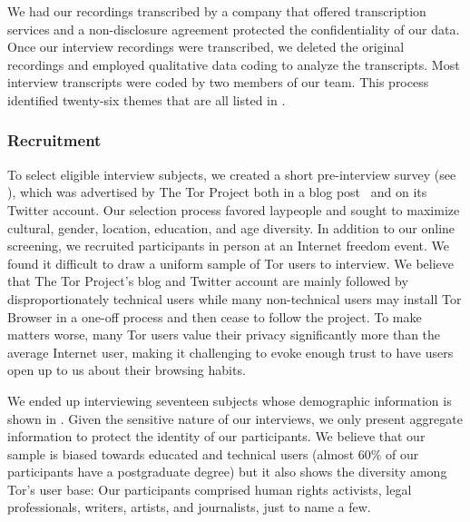 We had our recordings transcribed by a company that offered transcription
services and a non-disclosure agreement protected the confidentiality of our
data.  Once our interview recordings were transcribed, we deleted the original
recordings and employed qualitative data coding to analyze the transcripts.
Most interview transcripts were coded by two members of our team.  This process
identified twenty-six themes that are all listed in .

\subsubsection{Recruitment}

To select eligible interview subjects, we created a short pre-interview survey
(see ), which was advertised by The Tor
Project both in a blog post~\cite{Winter2017a} and on its Twitter account.  Our
selection process favored laypeople and sought to maximize cultural, gender,
location, education, and age diversity.  In addition to our online screening, we
recruited participants in person at an Internet freedom event.  We found it
difficult to draw a uniform sample of Tor users to interview. We believe that
The Tor Project's blog and Twitter account are mainly followed by
disproportionately technical users while many non-technical users may install
Tor Browser in a one-off process and then cease to follow the project.  To make
matters worse, many Tor users value their privacy significantly more than the
average Internet user, making it challenging to evoke enough trust to have users
open up to us about their browsing habits.

We ended up interviewing seventeen subjects whose demographic information is
shown in .  Given the sensitive nature of our
interviews, we only present aggregate information to protect the identity of our
participants.  We believe that our sample is biased towards educated and
technical users (almost 60\% of our participants have a postgraduate degree) but
it also shows the diversity among Tor's user base: Our participants comprised
human rights activists, legal professionals, writers, artists, and journalists,
just to name a few.

